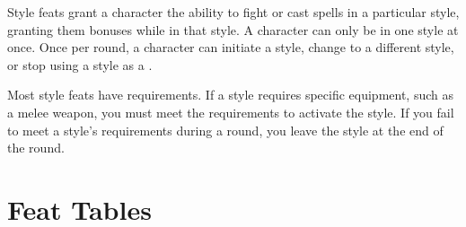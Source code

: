         \label{Style Feats}
        Style feats grant a character the ability to fight or cast spells in a particular style, granting them bonuses while in that style.
        A character can only be in one style at once.
        Once per round, a character can initiate a style, change to a different style, or stop using a style as a .

        Most style feats have requirements.
        If a style requires specific equipment, such as a melee weapon, you must meet the requirements to activate the style.
        If you fail to meet a style's requirements during a round, you leave the style at the end of the round.

\section{Feat Tables}
    \newpage\onecolumn


